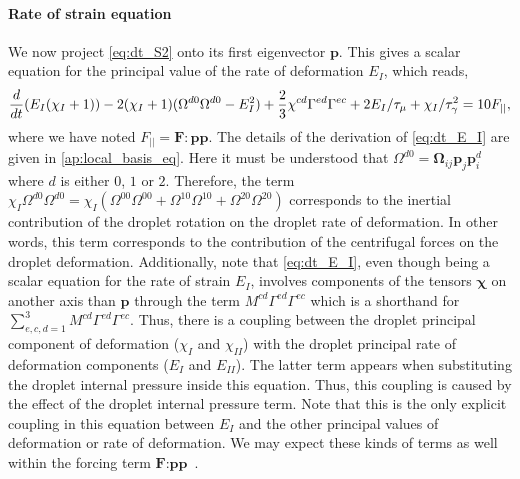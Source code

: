 \paragraph*{Rate of strain equation}
We now project \ref{eq:dt_S2} onto its first eigenvector $\textbf{p}$.
This gives a scalar equation for the principal value of the rate of deformation $E_I$, which reads, 
\begin{equation}
        \ddt (E_I (\chi_I+1))
        - 2(\chi_I+1)( \Omega^{d0} \Omega^{d0}  - E_I^2) 
        + \frac{2}{3} \chi^{cd}
        \Gamma^{ed}\Gamma^{ec}
    + 2 E_I / \tau_\mu
    +  \chi_I /\tau_\gamma^2
    = 10 F_{||},
    \label{eq:dt_E_I}
\end{equation} 
where we have noted $F_{||} = \textbf{F}: \textbf{pp}$.
The details of the derivation of \ref{eq:dt_E_I} are given in \ref{ap:local_basis_eq}. 
Here it must be understood that $\Omega^{d0}  = \bm\Omega_{ij} \textbf{p}_j \textbf{p}^{d}_i $ where $d$ is either $0$, $1$ or $2$. 
Therefore, the term $\chi_I \Omega^{d0} \Omega^{d0} =\chi_I (\Omega^{00} \Omega^{00} + \Omega^{10} \Omega^{10} +\Omega^{20} \Omega^{20} ) $ corresponds to the inertial contribution of the droplet rotation on the droplet rate of deformation. 
In other words, this term corresponds to the contribution of the centrifugal forces on the droplet deformation. 
Additionally, note that \ref{eq:dt_E_I}, even though being a scalar equation for the rate of strain $E_I$, involves components of the tensors $\bm\chi$ on another axis than $\textbf{p}$ through the term $M^{cd}\Gamma^{ed}\Gamma^{ec}$ which is a shorthand for $\sum_{e,c,d=1}^3 M^{cd}\Gamma^{ed}\Gamma^{ec}$. 
Thus, there is a coupling between the droplet principal component of deformation ($\chi_I$ and $\chi_{II}$) with the droplet principal rate of deformation components ($E_I$ and $E_{II}$).
The latter term appears when substituting the droplet internal pressure inside this equation. 
Thus, this coupling is caused by the effect of the droplet internal pressure term. 
Note that this is the only explicit coupling in this equation between $E_I$ and the other principal values of deformation or rate of deformation. 
We may expect these kinds of terms as well within the forcing term $\textbf{F}:\textbf{pp}$ . 


